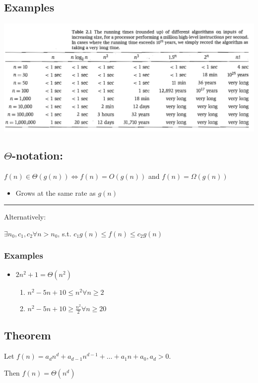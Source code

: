 \documentclass[11pt]{article}
\begin{document}
\subsection{Examples}
\label{sec:org3d238a1}
\begin{center}
\includegraphics[width=.9\linewidth]{./Images/i6.jpg}
\end{center}
\subsection{\(\Theta\)-notation:}
\label{sec:org28cbcfd}
\(f(n) \in \Theta (g(n)) \iff f(n) = O(g(n))\) and \(f(n)=\Omega(g(n))\)
\begin{itemize}
\item Grows at the same rate as \(g(n)\)
\end{itemize}

\noindent\rule{\textwidth}{0.5pt}
Alternatively:

\(\exists n_0, c_1, c_2 \forall n>n_0\), s.t. \(c_1g(n)\leq f(n) \leq c_2 g(n)\)
\subsubsection{Examples}
\label{sec:org3d33746}
\begin{itemize}
\item \(2n^2+1 = \Theta(n^2)\)
\begin{enumerate}
\item \(n^2-5n+10 \leq n^2 \forall n \geq 2\)
\item \(n^2-5n+10 \geq \frac{n^2}{2} \forall n \geq 20\)
\end{enumerate}
\end{itemize}
\subsection{Theorem}
\label{sec:orgf13fc61}
Let \(f(n)=a_d n^d + a_{d-1}n^{d-1}+\ldots+a_1 n + a_0, a_d>0\).

Then \(f(n)=\Theta(n^d)\)
\end{document}
